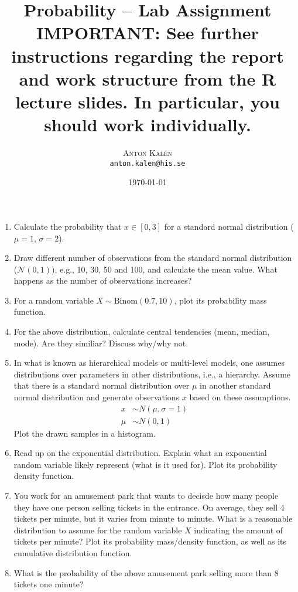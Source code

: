 \documentclass{article}
\author{
        \large
        \textsc{Anton Kalén} \\
        \texttt{anton.kalen@his.se}
}
\title{Probability -- Lab Assignment
{\large {\bf IMPORTANT:} See further instructions regarding the report and work structure from the R lecture slides. In particular, you should work  individually.}           
\\[1cm]}
\date{\today}
\begin{document}
\maketitle
\thispagestyle{empty}   
\begin{enumerate}
	\item Calculate the probability that $x \in [0, 3]$ for a standard 
		normal distribution ($\mu = 1$, $\sigma = 2$).	
	\item Draw different number of observations from the standard normal 
		distribution ($\mathcal{N}(0,1)$), e.g., 10, 30, 50 and 100, and calculate the mean value.
		What happens as the number of observations increases?
	\item For a random variable $X \sim \text{Binom}(0.7, 10)$, plot its probability mass function.
	\item For the above distribution, calculate central tendencies (mean, median, mode). Are they similiar? Discuss why/why not.
	\item In what is known as hierarchical models or multi-level models, one assumes distributions over parameters in
		other distributions, i.e., a hierarchy. Assume that there is a 
		standard normal distribution over $\mu$ in another standard normal
		distribution and generate observations $x$ based on these assumptions.
		\begin{equation}
		\begin{split}
			x &\sim N(\mu, \sigma=1)\\
			\mu &\sim N(0,1)
		\end{split}
		\end{equation}
		Plot the drawn samples in a histogram.
	\item Read up on the exponential distribution. Explain what an exponential random variable likely represent (what is it used for). Plot its probability density function.
	\item You work for an amusement park that wants to decisde how many people they have one person selling tickets in the entrance. On average, they sell 4 tickets per minute, but it varies from minute to minute. What is a reasonable distribution to assume for the random variable $X$ indicating the amount of tickets per minute? Plot its probability mass/density function, as well as its cumulative distribution function.
	\item What is the probability of the above amusement park selling more than 8 tickets one minute?
\end{enumerate}
\end{document}
